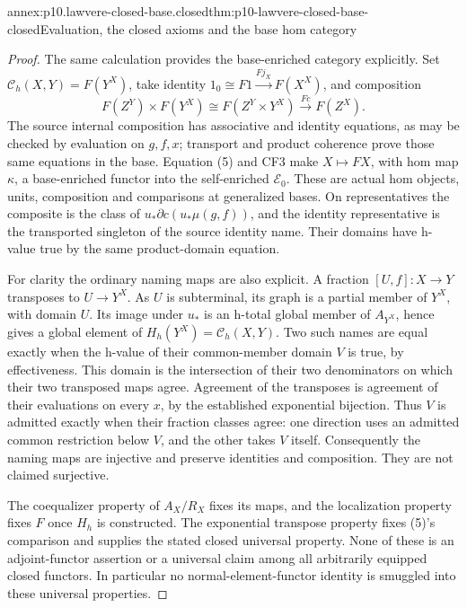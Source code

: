 \begin{annexitem}{annex:p10.lawvere-closed-base.closed}{thm:p10-lawvere-closed-base-closed}{Evaluation, the closed axioms and the base hom category}
\begin{proof}
The same calculation provides the base-enriched category explicitly.
Set \(\mathcal C_h(X,Y)=F(Y^X)\), take identity
\(1_0\cong F1\xrightarrow{Fj_X}F(X^X)\), and composition
\[
 F(Z^Y)\times F(Y^X)\cong F(Z^Y\times Y^X)
                                      \xrightarrow{Fc}F(Z^X).
\]
The source internal composition has associative and identity equations,
as may be checked by evaluation on \(g,f,x\); transport and product
coherence prove those same equations in the base. Equation (5) and CF3
make \(X\mapsto FX\), with hom map \(\kappa\), a base-enriched
functor into the self-enriched \(\mathcal E_0\). These are actual
hom objects, units, composition and comparisons at generalized bases.
On representatives the composite is the class of
\(u_*\partial c(u_*\mu(g,f))\), and the identity representative
is the transported singleton of the source identity name. Their
domains have h-value true by the same product-domain equation.

For clarity the ordinary naming maps are also explicit. A fraction
\([U,f]:X\to Y\) transposes to \(U\to Y^X\). As \(U\)
is subterminal, its graph is a partial member of \(Y^X\), with
domain \(U\). Its image under \(u_*\) is an h-total global
member of \(A_{Y^X}\), hence gives a global element of
\(H_h(Y^X)=\mathcal C_h(X,Y)\). Two such names are equal
exactly when the h-value of their common-member domain \(V\)
is true, by effectiveness. This domain is the intersection of their
two denominators on which their two transposed maps agree. Agreement
of the transposes is agreement of their evaluations on every \(x\),
by the established exponential bijection. Thus \(V\) is admitted
exactly when their fraction classes agree: one direction uses an
admitted common restriction below \(V\), and the other takes
\(V\) itself. Consequently the naming maps are injective and
preserve identities and composition. They are not claimed surjective.

The coequalizer property of \(A_X/R_X\) fixes its maps, and the
localization property fixes \(F\) once \(H_h\) is constructed.
The exponential transpose property fixes (5)'s comparison and supplies
the stated closed universal property. None of these is an adjoint-functor
assertion or a universal claim among all arbitrarily equipped closed
functors. In particular no normal-element-functor identity is smuggled
into these universal properties.
\end{proof}
\end{annexitem}

